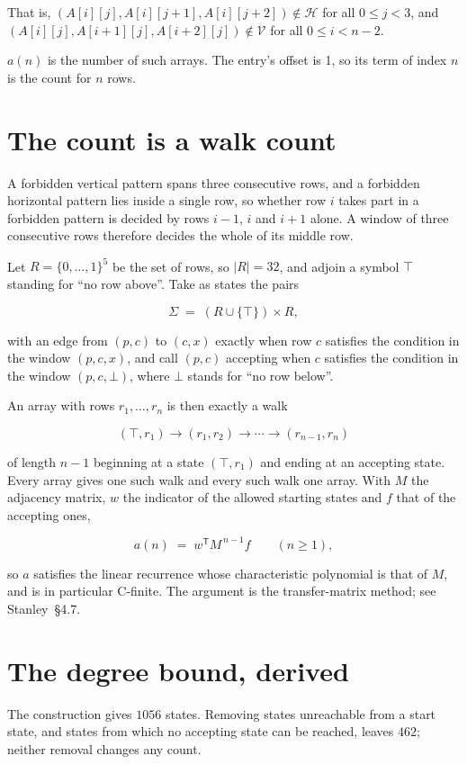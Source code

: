 \documentclass[11pt]{article}
\theoremstyle{definition}
\begin{document}
That is, $(A[i][j],A[i][j{+}1],A[i][j{+}2]) \notin \mathcal{H}$ for all $0 \le j < 3$, and $(A[i][j],A[i{+}1][j],A[i{+}2][j]) \notin \mathcal{V}$ for all $0 \le i < n-2$.

$a(n)$ is the number of such arrays. The entry's offset is 1, so its term of index $n$ is the count for $n$ rows.

\section{The count is a walk count}

A forbidden vertical pattern spans three consecutive rows, and a forbidden horizontal pattern lies inside a single row, so whether row $i$ takes part in a forbidden pattern is decided by rows $i-1$, $i$ and $i+1$ alone. A window of three consecutive rows therefore decides the whole of its middle row.

Let $R = \{0,\dots,1\}^{5}$ be the set of rows, so $|R| = 32$, and adjoin a symbol $\top$ standing for ``no row above''. Take as states the pairs

\[\Sigma \;=\; (R \cup \{\top\}) \times R,\]

with an edge from $(p,c)$ to $(c,x)$ exactly when row $c$ satisfies the condition in the window $(p,c,x)$, and call $(p,c)$ accepting when $c$ satisfies the condition in the window $(p,c,\bot)$, where $\bot$ stands for ``no row below''.

An array with rows $r_1,\dots,r_n$ is then exactly a walk

\[(\top,r_1) \to (r_1,r_2) \to \cdots \to (r_{n-1},r_n)\]

of length $n-1$ beginning at a state $(\top,r_1)$ and ending at an accepting state. Every array gives one such walk and every such walk one array. With $M$ the adjacency matrix, $w$ the indicator of the allowed starting states and $f$ that of the accepting ones,

\[a(n) \;=\; w^{\mathsf T} M^{\,n-1} f \qquad (n \ge 1),\]

so $a$ satisfies the linear recurrence whose characteristic polynomial is that of $M$, and is in particular C-finite. The argument is the transfer-matrix method; see Stanley~\S4.7.

\section{The degree bound, derived}

The construction gives $1056$ states. Removing states unreachable from a start state, and states from which no accepting state can be reached, leaves $462$; neither removal changes any count.
\end{document}
